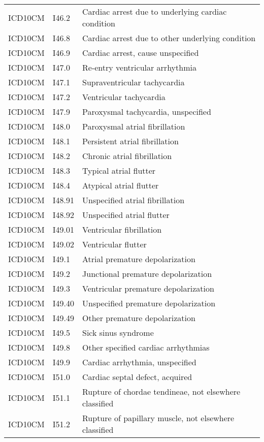 \begin{longtable}{p{}p{}p{}}
  ICD10CM & I46.2 & Cardiac arrest due to underlying cardiac condition \\ 
  ICD10CM & I46.8 & Cardiac arrest due to other underlying condition \\ 
  ICD10CM & I46.9 & Cardiac arrest, cause unspecified \\ 
  ICD10CM & I47.0 & Re-entry ventricular arrhythmia \\ 
  ICD10CM & I47.1 & Supraventricular tachycardia \\ 
  ICD10CM & I47.2 & Ventricular tachycardia \\ 
  ICD10CM & I47.9 & Paroxysmal tachycardia, unspecified \\ 
  ICD10CM & I48.0 & Paroxysmal atrial fibrillation \\ 
  ICD10CM & I48.1 & Persistent atrial fibrillation \\ 
  ICD10CM & I48.2 & Chronic atrial fibrillation \\ 
  ICD10CM & I48.3 & Typical atrial flutter \\ 
  ICD10CM & I48.4 & Atypical atrial flutter \\ 
  ICD10CM & I48.91 & Unspecified atrial fibrillation \\ 
  ICD10CM & I48.92 & Unspecified atrial flutter \\ 
  ICD10CM & I49.01 & Ventricular fibrillation \\ 
  ICD10CM & I49.02 & Ventricular flutter \\ 
  ICD10CM & I49.1 & Atrial premature depolarization \\ 
  ICD10CM & I49.2 & Junctional premature depolarization \\ 
  ICD10CM & I49.3 & Ventricular premature depolarization \\ 
  ICD10CM & I49.40 & Unspecified premature depolarization \\ 
  ICD10CM & I49.49 & Other premature depolarization \\ 
  ICD10CM & I49.5 & Sick sinus syndrome \\ 
  ICD10CM & I49.8 & Other specified cardiac arrhythmias \\ 
  ICD10CM & I49.9 & Cardiac arrhythmia, unspecified \\ 
  ICD10CM & I51.0 & Cardiac septal defect, acquired \\ 
  ICD10CM & I51.1 & Rupture of chordae tendineae, not elsewhere classified \\ 
  ICD10CM & I51.2 & Rupture of papillary muscle, not elsewhere classified \\ 

\end{longtable}
